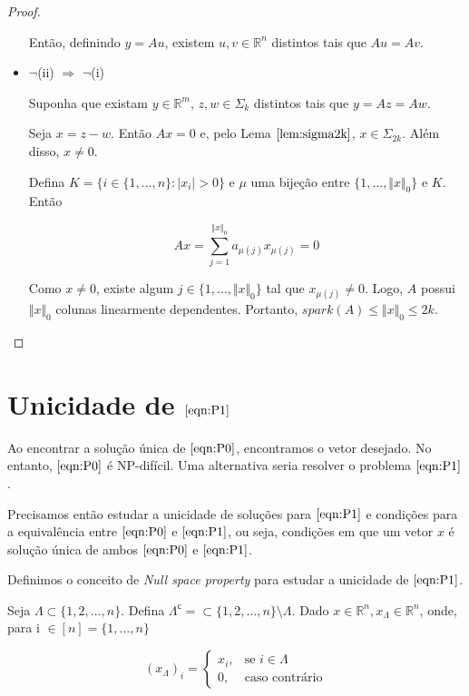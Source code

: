 \begin{proof}
\begin{itemize}
Então, definindo $y = Au$, existem $u, v \in \mathbb{R}^n$ distintos tais que $Au = Av$.
\item $\neg$(ii) $\Rightarrow$ $\neg$(i)

Suponha que existam $y \in \mathbb{R}^m$, $z, w \in \Sigma_k$ distintos tais que $y = Az = Aw$.

Seja $x = z - w$. Então $Ax = 0$ e, pelo Lema $\ref{lem:sigma2k}$, $x \in \Sigma_{2k}$. Além disso, $x \neq 0$.

Defina $K = \lbrace i \in \lbrace 1, \hdots, n \rbrace: \vert x_i \vert > 0 \rbrace$ e $\mu$ uma bijeção entre $\lbrace 1, \hdots, \Vert x \Vert_0 \rbrace$ e $K$. Então

$$ Ax = \sum_{j = 1}^{\Vert x \Vert_0} a_{\mu(j)} x_{\mu(j)} = 0$$

Como $x \neq 0$, existe algum $j \in \lbrace 1, \hdots, \Vert x \Vert_0 \rbrace$ tal que $x_{\mu(j)} \neq 0$. Logo, $A$ possui $\Vert x \Vert_0$ colunas linearmente dependentes. Portanto, $\textit{spark}(A) \leq \Vert x \Vert_0 \leq 2k$.
\end{itemize}
\end{proof}
\section{Unicidade de $\eqref{eqn:P1}$}

Ao encontrar a solução única de $\eqref{eqn:P0}$, encontramos o vetor desejado. No entanto, $\eqref{eqn:P0}$ é NP-difícil. Uma alternativa seria resolver o problema $\eqref{eqn:P1}$.

Precisamos então estudar a unicidade de soluções para $\eqref{eqn:P1}$ e condições para a equivalência entre $\eqref{eqn:P0}$ e $\eqref{eqn:P1}$, ou seja, condições em que um vetor $x$ é solução única de ambos $\eqref{eqn:P0}$ e $\eqref{eqn:P1}$.

Definimos o conceito de \textit{Null space property} para estudar a unicidade de $\eqref{eqn:P1}$.

\begin{definicao} Seja $\Lambda \subset \lbrace 1, 2, \hdots, n \rbrace$. Defina $\Lambda^{\mathsf{c}} = \subset \lbrace 1, 2, \hdots, n \rbrace \setminus \Lambda$. Dado $x \in \mathbb{R}^n, x_{\Lambda} \in \mathbb{R}^n$, onde, para i $\in [n] = \{1, \hdots, n\}$

$$(x_{\Lambda})_i = 
\begin{cases}
x_i, &\mbox{se } i \in \Lambda \\
0,   &\mbox{caso contrário}
\end{cases}$$

\end{definicao}

